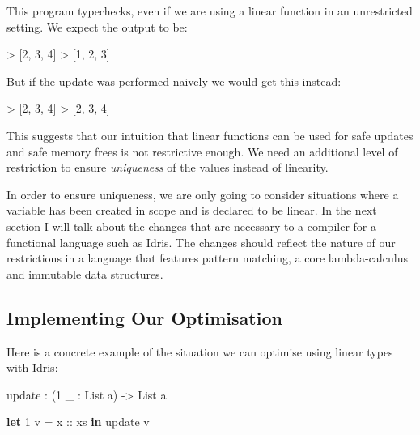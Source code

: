 \documentclass[
]{article}
\newenvironment{Shaded}{}{}
\newcommand{\DataTypeTok}[1]{\textcolor[rgb]{0.56,0.13,0.00}{#1}}
\newcommand{\DecValTok}[1]{\textcolor[rgb]{0.25,0.63,0.44}{#1}}
\newcommand{\KeywordTok}[1]{\textcolor[rgb]{0.00,0.44,0.13}{\textbf{#1}}}
\newcommand{\NormalTok}[1]{#1}
\newcommand{\OperatorTok}[1]{\textcolor[rgb]{0.40,0.40,0.40}{#1}}
\newcommand{\OtherTok}[1]{\textcolor[rgb]{0.00,0.44,0.13}{#1}}
\begin{document}
This program typechecks, even if we are using a linear function in an
unrestricted setting. We expect the output to be:

\begin{Shaded}
\begin{Highlighting}[]
\OperatorTok{\textgreater{}}\NormalTok{ [}\DecValTok{2}\NormalTok{, }\DecValTok{3}\NormalTok{, }\DecValTok{4}\NormalTok{]}
\OperatorTok{\textgreater{}}\NormalTok{ [}\DecValTok{1}\NormalTok{, }\DecValTok{2}\NormalTok{, }\DecValTok{3}\NormalTok{]}
\end{Highlighting}
\end{Shaded}

But if the update was performed naively we would get this instead:

\begin{Shaded}
\begin{Highlighting}[]
\OperatorTok{\textgreater{}}\NormalTok{ [}\DecValTok{2}\NormalTok{, }\DecValTok{3}\NormalTok{, }\DecValTok{4}\NormalTok{]}
\OperatorTok{\textgreater{}}\NormalTok{ [}\DecValTok{2}\NormalTok{, }\DecValTok{3}\NormalTok{, }\DecValTok{4}\NormalTok{]}
\end{Highlighting}
\end{Shaded}

This suggests that our intuition that linear functions can be used for
safe updates and safe memory frees is not restrictive enough. We need an
additional level of restriction to ensure \emph{uniqueness} of the
values instead of linearity.

In order to ensure uniqueness, we are only going to consider situations
where a variable has been created in scope and is declared to be linear.
In the next section I will talk about the changes that are necessary to
a compiler for a functional language such as Idris. The changes should
reflect the nature of our restrictions in a language that features
pattern matching, a core lambda-calculus and immutable data structures.

\hypertarget{implementing-our-optimisation}{%
\subsection{Implementing Our
Optimisation}\label{implementing-our-optimisation}}

\label{subsec:implementing-optimisation}

Here is a concrete example of the situation we can optimise using linear
types with Idris:

\begin{Shaded}
\begin{Highlighting}[]
\NormalTok{update }\OperatorTok{:}\NormalTok{ (}\DecValTok{1}\NormalTok{ \_ }\OperatorTok{:} \DataTypeTok{List}\NormalTok{ a) }\OtherTok{{-}\textgreater{}} \DataTypeTok{List}\NormalTok{ a}

\KeywordTok{let} \DecValTok{1}\NormalTok{ v }\OtherTok{= x ::}\NormalTok{ xs }\KeywordTok{in}
\NormalTok{    update v}
\end{Highlighting}
\end{Shaded}
\end{document}
